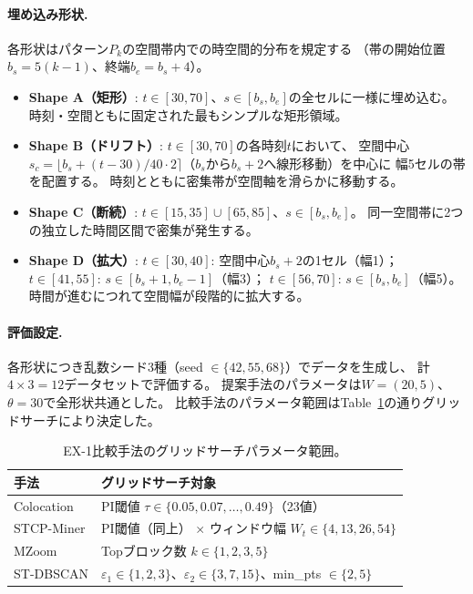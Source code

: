 \paragraph{埋め込み形状.}
各形状はパターン$P_k$の空間帯内での時空間的分布を規定する
（帯の開始位置$b_s = 5(k-1)$、終端$b_e = b_s + 4$）。

\begin{itemize}
\item \textbf{Shape A（矩形）}:
  $t \in [30,70]$、$s \in [b_s, b_e]$の全セルに一様に埋め込む。
  時刻・空間ともに固定された最もシンプルな矩形領域。
\item \textbf{Shape B（ドリフト）}:
  $t \in [30,70]$の各時刻$t$において、
  空間中心$s_c = \lfloor b_s + (t - 30) / 40 \cdot 2 \rceil$（$b_s$から$b_s{+}2$へ線形移動）を中心に
  幅5セルの帯を配置する。
  時刻とともに密集帯が空間軸を滑らかに移動する。
\item \textbf{Shape C（断続）}:
  $t \in [15,35] \cup [65,85]$、$s \in [b_s, b_e]$。
  同一空間帯に2つの独立した時間区間で密集が発生する。
\item \textbf{Shape D（拡大）}:
  $t \in [30,40]$: 空間中心$b_s{+}2$の1セル（幅1）；
  $t \in [41,55]$: $s \in [b_s{+}1, b_e{-}1]$（幅3）；
  $t \in [56,70]$: $s \in [b_s, b_e]$（幅5）。
  時間が進むにつれて空間幅が段階的に拡大する。
\end{itemize}

\paragraph{評価設定.}
各形状につき乱数シード3種（seed $\in \{42,55,68\}$）でデータを生成し、
計$4 \times 3 = 12$データセットで評価する。
提案手法のパラメータは$W = (20, 5)$、$\theta = 30$で全形状共通とした。
比較手法のパラメータ範囲はTable~\ref{tab:params_ex3}の通りグリッドサーチにより決定した。

\begin{table}[h]
\centering
\caption{EX-1比較手法のグリッドサーチパラメータ範囲。}
\label{tab:params_ex3}
\small
\begin{tabular}{lp{}}
\toprule
手法 & グリッドサーチ対象 \\
\midrule
Colocation   & PI閾値 $\tau \in \{0.05, 0.07, \ldots, 0.49\}$（23値） \\
STCP-Miner   & PI閾値（同上） $\times$ ウィンドウ幅 $W_t \in \{4, 13, 26, 54\}$ \\
MZoom        & Topブロック数 $k \in \{1, 2, 3, 5\}$ \\
ST-DBSCAN    & $\varepsilon_1 \in \{1,2,3\}$、$\varepsilon_2 \in \{3,7,15\}$、min\_pts $\in \{2,5\}$ \\
\bottomrule
\end{tabular}
\end{table}

